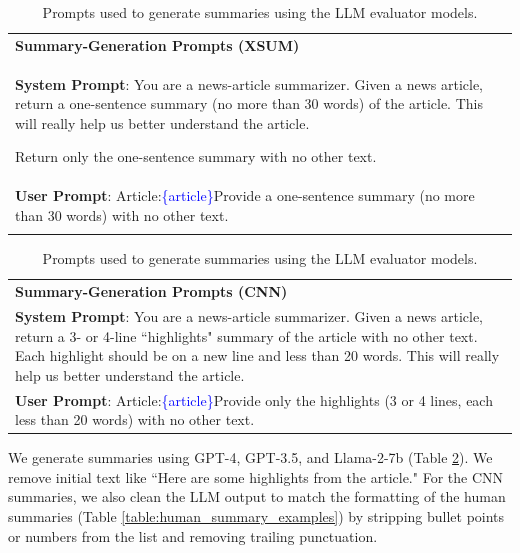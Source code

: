 \documentclass{article}
\theoremstyle{plain}
\theoremstyle{definition}
\theoremstyle{remark}
\begin{document}
\begin{table}[h!]
    \centering
    \footnotesize
    \begin{tabular}{>{\columncolor{gray!20}}p{}}
        \textbf{Summary-Generation Prompts (XSUM)}\\
        \textbf{System Prompt}: You are a news-article summarizer. Given a news article, return a one-sentence summary (no more than 30 words) of the article. This will really help us better understand the article.
        
        Return only the one-sentence summary with no other text. \\
        \textbf{User Prompt}: Article:\newline\textcolor{blue}{\{article\}}\newline\newline Provide a one-sentence summary (no more than 30 words) with no other text. \\
        \multicolumn{1}{c}{} \\ %
    \end{tabular}
    \begin{tabular}{>{\columncolor{gray!20}}p{}}
        \textbf{Summary-Generation Prompts (CNN)}\\
        \textbf{System Prompt}: You are a news-article summarizer. Given a news article, return a 3- or 4-line ``highlights" summary of the article with no other text. Each highlight should be on a new line and less than 20 words. This will really help us better understand the article. \\
        \textbf{User Prompt}: Article:\newline\textcolor{blue}{\{article\}}\newline\newline Provide only the highlights (3 or 4 lines, each less than 20 words) with no other text. \\
    \end{tabular}
    \caption{Prompts used to generate summaries using the LLM evaluator models.}
    \label{table:summary_generation_prompts}
\end{table}

We generate summaries using GPT-4, GPT-3.5, and Llama-2-7b (Table \ref{table:summary_generation_prompts}). We remove initial text like ``Here are some highlights from the article." For the CNN summaries, we also clean the LLM output to match the formatting of the human summaries (Table \ref{table:human_summary_examples}) by stripping bullet points or numbers from the list and removing trailing punctuation.
\end{document}
